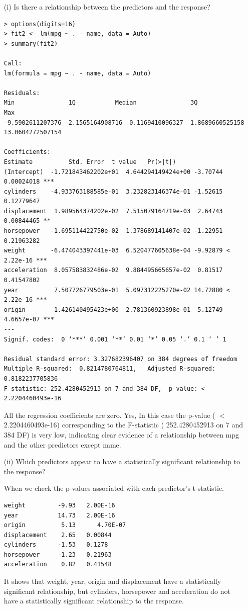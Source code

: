 \documentclass{article}
\begin{document}
\begin{itemize}
\newpage

\item[(i)] Is there a relationship between the predictors and the response?

\begin{program}
\begin{verbatim}
> options(digits=16)
> fit2 <- lm(mpg ~ . - name, data = Auto)
> summary(fit2)

Call:
lm(formula = mpg ~ . - name, data = Auto)

Residuals:
Min               1Q           Median               3Q              Max 
-9.5902611207376 -2.1565164908716 -0.1169410096327  1.8689660525158 13.0604272507154 

Coefficients:
Estimate          Std. Error  t value   Pr(>|t|)    
(Intercept)  -1.721843462202e+01  4.644294149424e+00 -3.70744 0.00024018 ***
cylinders    -4.933763188585e-01  3.232823146374e-01 -1.52615 0.12779647    
displacement  1.989564374202e-02  7.515079164719e-03  2.64743 0.00844465 ** 
horsepower   -1.695114422750e-02  1.378689141407e-02 -1.22951 0.21963282    
weight       -6.474043397441e-03  6.520477605638e-04 -9.92879 < 2.22e-16 ***
acceleration  8.057583832486e-02  9.884495665657e-02  0.81517 0.41547802    
year          7.507726779503e-01  5.097312225270e-02 14.72880 < 2.22e-16 ***
origin        1.426140495423e+00  2.781360923898e-01  5.12749 4.6657e-07 ***
---
Signif. codes:  0 ‘***’ 0.001 ‘**’ 0.01 ‘*’ 0.05 ‘.’ 0.1 ‘ ’ 1

Residual standard error: 3.327682396407 on 384 degrees of freedom
Multiple R-squared:  0.8214780764811,	Adjusted R-squared:  0.8182237705836 
F-statistic: 252.4280452913 on 7 and 384 DF,  p-value: < 2.2204460493e-16
\end{verbatim}
	\caption{.}
\end{program}


All the regression coefficients are zero.
Yes, In this case the p-value ( $<$ 2.2204460493e-16)  corresponding to the F-statistic ( 252.4280452913 on 7 and 384 DF)  is very low, indicating clear evidence of a relationship between mpg and the other predictors except name.


\item[(ii)] Which predictors appear to have a statistically significant relationship to the response?
\newline

When we check the p-values associated with each predictor's t-statistic.

\begin{program}
\begin{verbatim}
weight         -9.93   2.00E-16
year           14.73   2.00E-16
origin          5.13	  4.70E-07
displacement    2.65   0.00844
cylinders      -1.53   0.1278
horsepower     -1.23   0.21963
acceleration    0.82   0.41548
\end{verbatim}
\end{program}
It shows that weight, year, origin and displacement have a statistically significant relationship, but
cylinders, horsepower and acceleration do not have a statistically significant relationship to the response.



\end{itemize}
\end{document}
